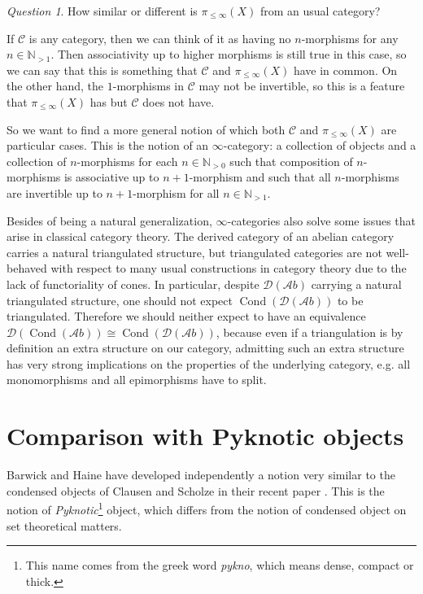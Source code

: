 \documentclass[11pt,A4]{article}
\theoremstyle{plain}
\theoremstyle{definition}
\theoremstyle{remark}
\newtheorem{q}[thm]{Question}
\newcommand{\N}{\mathbb{N}}
\newcommand{\1}{\mathbbm{1}}
\newcommand{\C}{\mathscr{C}}
\newcommand{\Ab}{\mathscr{A}b}
\newcommand{\D}{\mathscr{D}}
\DeclareMathOperator{\Cond}{Cond}
\begin{document}
\begin{q}
    How similar or different is $\pi_{\leqslant \infty}(X)$ from an usual category?
\end{q}

If $\C$ is any category, then we can think of it as having no $n$-morphisms for any $n\in \N_{>1}$.
Then associativity up to higher morphisms is still true in this case, so we can say that this is something that $\C$ and $\pi_{\leqslant \infty }(X)$ have in common.
On the other hand, the $1$-morphisms in $\C$ may not be invertible, so this is a feature that $\pi_{\leqslant \infty}(X)$ has but $\C$ does not have.

So we want to find a more general notion of which both $\C$ and $\pi_{\leqslant \infty}(X)$ are particular cases.
This is the notion of an $\infty$-category: a collection of objects and a collection of $n$-morphisms for each $n\in \N_{>0}$ such that composition of $n$-morphisms is associative up to $n+1$-morphism and such that all $n$-morphisms are invertible up to $n+1$-morphism for all $n\in\N_{>1}$.

Besides of being a natural generalization, $\infty$-categories also solve some issues that arise in classical category theory.
The derived category of an abelian category carries a natural triangulated structure, but triangulated categories are not well-behaved with respect to many usual constructions in category theory due to the lack of functoriality of cones.
In particular, despite $\D(\Ab)$ carrying a natural triangulated structure, one should not expect $\Cond(\D(\Ab))$ to be triangulated.
Therefore we should neither expect to have an equivalence $\D(\Cond(\Ab))\cong \Cond(\D(\Ab))$, because even if a triangulation is by definition an extra structure on our category, admitting such an extra structure has very strong implications on the properties of the underlying category, e.g. all monomorphisms and all epimorphisms have to split.

\section{Comparison with Pyknotic objects}

Barwick and Haine have developed independently a notion very similar to the condensed objects of Clausen and Scholze in their recent paper \cite{bh19}.
This is the notion of \textit{Pyknotic}\footnote{This name comes from the greek word \textit{pykno}, which means dense, compact or thick.} object, which differs from the notion of condensed object on set theoretical matters.





\end{document}
